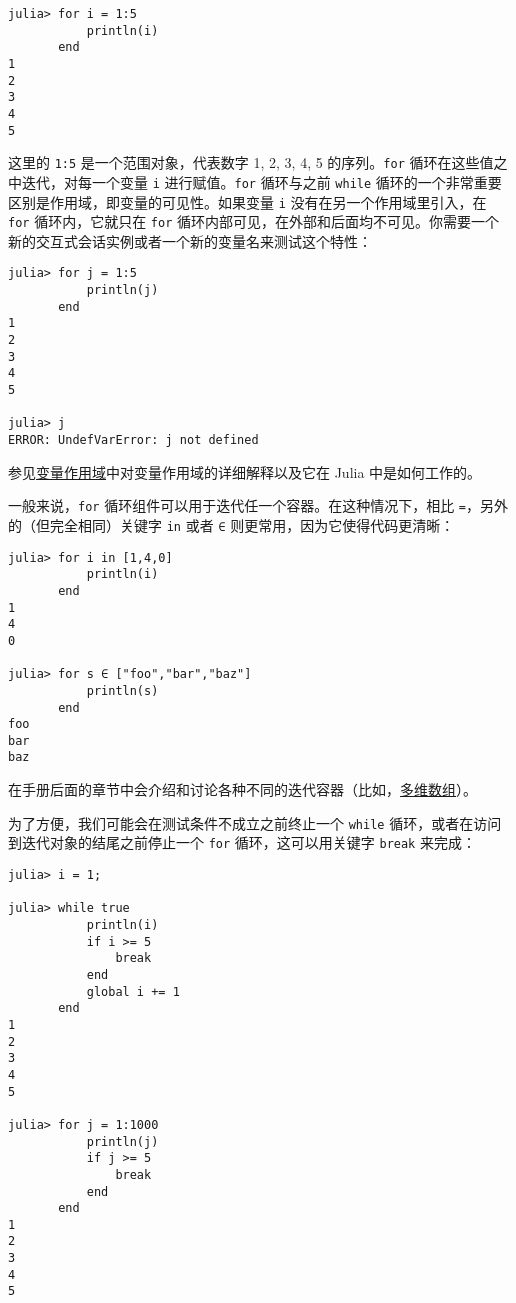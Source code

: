\begin{verbatim}
julia> for i = 1:5
           println(i)
       end
1
2
3
4
5
\end{verbatim}



这里的 \texttt{1:5} 是一个范围对象，代表数字 1, 2, 3, 4, 5 的序列。\texttt{for} 循环在这些值之中迭代，对每一个变量 \texttt{i} 进行赋值。\texttt{for} 循环与之前 \texttt{while} 循环的一个非常重要区别是作用域，即变量的可见性。如果变量 \texttt{i} 没有在另一个作用域里引入，在 \texttt{for} 循环内，它就只在 \texttt{for} 循环内部可见，在外部和后面均不可见。你需要一个新的交互式会话实例或者一个新的变量名来测试这个特性：




\begin{verbatim}
julia> for j = 1:5
           println(j)
       end
1
2
3
4
5

julia> j
ERROR: UndefVarError: j not defined
\end{verbatim}



参见\hyperlink{11957539949537805757}{变量作用域}中对变量作用域的详细解释以及它在 Julia 中是如何工作的。



一般来说，\texttt{for} 循环组件可以用于迭代任一个容器。在这种情况下，相比 \texttt{=}，另外的（但完全相同）关键字 \texttt{in} 或者 \texttt{∈} 则更常用，因为它使得代码更清晰：




\begin{verbatim}
julia> for i in [1,4,0]
           println(i)
       end
1
4
0

julia> for s ∈ ["foo","bar","baz"]
           println(s)
       end
foo
bar
baz
\end{verbatim}



在手册后面的章节中会介绍和讨论各种不同的迭代容器（比如，\hyperlink{16720099245556932994}{多维数组}）。



为了方便，我们可能会在测试条件不成立之前终止一个 \texttt{while} 循环，或者在访问到迭代对象的结尾之前停止一个 \texttt{for} 循环，这可以用关键字 \texttt{break} 来完成：




\begin{verbatim}
julia> i = 1;

julia> while true
           println(i)
           if i >= 5
               break
           end
           global i += 1
       end
1
2
3
4
5

julia> for j = 1:1000
           println(j)
           if j >= 5
               break
           end
       end
1
2
3
4
5
\end{verbatim}



